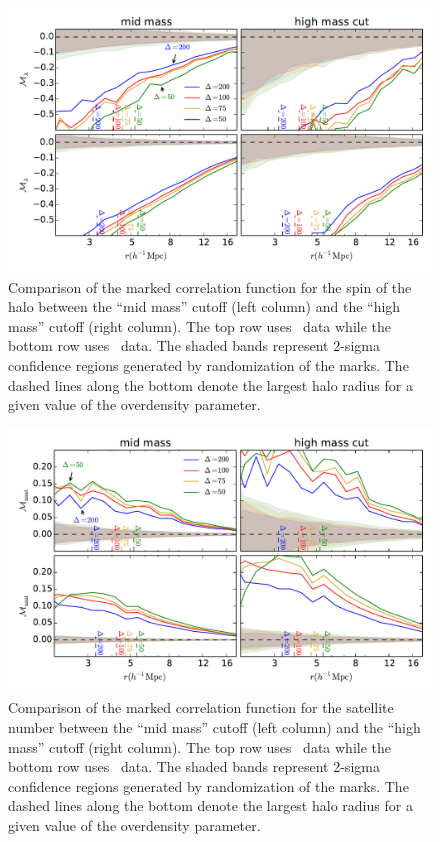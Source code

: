 \documentclass[usenatbib,usegraphicx,letterpaper]{mn2e}
\begin{document}
\begin{figure}
	\centering
	\includegraphics[width=.9\textwidth]{all_mcf_spin_z00_hostsvhigh.pdf}
	\caption{Comparison of the marked correlation function for the spin of the halo between the ``mid mass'' cutoff (left column) and the ``high mass'' cutoff (right column). The top row uses \simB \ data while the bottom row uses \simC \ data. The shaded bands represent 2-sigma confidence regions generated by randomization of the marks. The dashed lines along the bottom denote the largest halo radius for a given value of the overdensity parameter.}
	\label{fig:hvh_mcf_spin}
\end{figure}

\begin{figure}
	\centering
	\includegraphics[width=.9\textwidth]{all_mcf_nsat_z00_hostsvhigh.pdf}
	\caption{Comparison of the marked correlation function for the satellite number between the ``mid mass'' cutoff (left column) and the ``high mass'' cutoff (right column). The top row uses \simB \ data while the bottom row uses \simC \ data. The shaded bands represent 2-sigma confidence regions generated by randomization of the marks. The dashed lines along the bottom denote the largest halo radius for a given value of the overdensity parameter.}
	\label{fig:hvh_mcf_nsat}
\end{figure}
\end{document}
